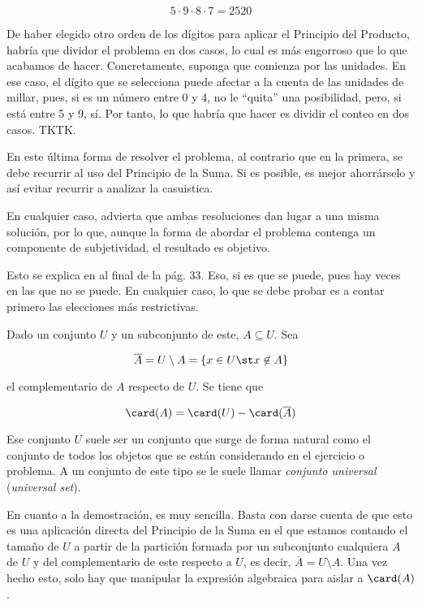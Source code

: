 $$ 5 \cdot 9 \cdot 8 \cdot 7 = 2520 $$

De haber elegido otro orden de los dígitos para aplicar el Principio del
Producto, habría que dividor el problema en dos casos, lo cual es más
engorroso que lo que acabamos de hacer. Concretamente, suponga que comienza
por las unidades. En ese caso, el dígito que se selecciona puede afectar a
la cuenta de las unidades de millar, pues, si es un número entre 0 y 4, no
le ``quita'' una posibilidad, pero, si está entre 5 y 9, sí. Por tanto, lo
que habría que hacer es dividir el conteo en dos casos. TKTK.

En este última forma de resolver el problema, al contrario que en la
primera, se debe recurrir al uso del Principio de la Suma. Si es posible, es
mejor ahorrárselo y así evitar recurrir a analizar la casuistica.

En cualquier caso, advierta que ambas resoluciones dan lugar a una misma
solución, por lo que, aunque la forma de abordar el problema contenga un
componente de subjetividad, el resultado es objetivo.

Esto se explica en \cite{brualdi} al final de la pág. 33. Eso, si es que se
puede, pues hay veces en las que no se puede. En cualquier caso, lo que se
debe probar es a contar primero las elecciones más restrictivas.

\begin{theorem}
  Dado un conjunto $U$ y un subconjunto de este, $A \subseteq U$. Sea

  $$ \overline{A} = U \setminus A = \{x \in U \st x \not\in A\} $$

  \noindent el complementario de $A$ respecto de $U$. Se tiene que

  $$ \card(A) = \card(U) - \card(\overline{A}) $$
\end{theorem}

Ese conjunto $U$ suele ser un conjunto que surge de forma natural como el
conjunto de todos los objetos que se están considerando en el ejercicio o
problema. A un conjunto de este tipo se le suele llamar \emph{conjunto
universal} (\emph{universal set}).

En cuanto a la demostración, es muy sencilla. Basta con darse cuenta de que
esto es una aplicación directa del Principio de la Suma en el que estamos
contando el tamaño de $U$ a partir de la partición formada por un
subconjunto cualquiera $A$ de $U$ y del complementario de este respecto a
$U$, es decir, $\overline{A} = U \setminus A$. Una vez hecho esto, solo hay
que manipular la expresión algebraica para aislar a $\card(A)$.

